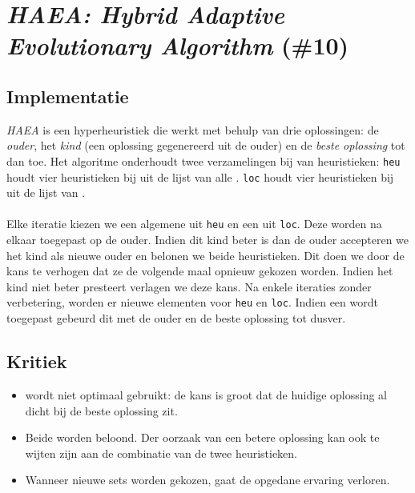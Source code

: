 \section{\emph{HAEA: Hybrid Adaptive Evolutionary Algorithm} (\#10)}

\subsection{Implementatie}
\emph{HAEA}\cite{chesc-haea,Gomez04selfadaptation} is een hyperheuristiek die werkt met behulp van drie oplossingen: de \emph{ouder}, het \emph{kind} (een oplossing gegenereerd uit de ouder) en de \emph{beste oplossing} tot dan toe. Het algoritme onderhoudt twee verzamelingen bij van heuristieken: \texttt{heu} houdt vier heuristieken bij uit de lijst van alle \abllhn{}. \texttt{loc} houdt vier heuristieken bij uit de lijst van \abls{} \abllhn{}.

\paragraph{}
Elke iteratie kiezen we een algemene \abh{} uit \texttt{heu} en een \abls{} \abllh{} uit \texttt{loc}. Deze \abhn{} worden na elkaar toegepast op de ouder. Indien dit kind beter is dan de ouder accepteren we het kind als nieuwe ouder en belonen we beide heuristieken. Dit doen we door de kans te verhogen dat ze de volgende maal opnieuw gekozen worden. Indien het kind niet beter presteert verlagen we deze kans. Na enkele iteraties zonder verbetering, worden er nieuwe elementen voor \texttt{heu} en \texttt{loc}. Indien een \abco{} \abllh{} wordt toegepast gebeurd dit met de ouder en de beste oplossing tot dusver.

\subsection{Kritiek}
\begin{itemize}
 \item \abco[C]{} wordt niet optimaal gebruikt: de kans is groot dat de huidige oplossing al dicht bij de beste oplossing zit.
 \item Beide \abhn{} worden beloond. Der oorzaak van een betere oplossing kan ook te wijten zijn aan de combinatie van de twee heuristieken.
 \item Wanneer nieuwe sets worden gekozen, gaat de opgedane ervaring verloren.
\end{itemize}
